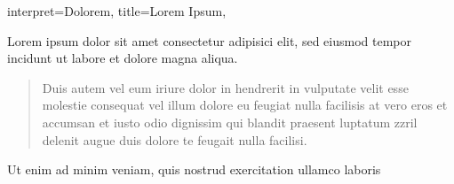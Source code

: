 \begin{song}{
interpret={Dolorem},
title={Lorem Ipsum},
}
\begin{chorus}
Lorem ipsum \leftrepeat\space\nolinebreak {}dolor sit amet \nolinebreak\rightrepeat\space \versebreak
{}consectetur adipisici elit, \versebreak
{}sed eiusmod tempor incidunt \versebreak
{}ut labore et dolore magna aliqua.
\end{chorus}

\begin{interlude}
\leftrepeat\space\nolinebreak {}  \normalbar\space {}  \leftrightrepeat\space {}  \normalbar\space {}  \nolinebreak\rightrepeat\space
\end{interlude}

\begin{verse}
  Duis autem vel eum iriure dolor in hendrerit in vulputate velit esse molestie \versebreak
{}consequat vel illum   dolore eu feugiat nulla facilisis at vero \versebreak
{}  eros et accumsan et iusto odio dignissim qui blandit praesent luptatum zzril \versebreak
\leftrepeat\space\nolinebreak {}delenit augue duis   dolore te feugait nulla facilisi.  \nolinebreak\rightrepeat
\end{verse}

\begin{bridge}
\leftrepeat\space\nolinebreak %
Ut enim ad minim veniam, quis nostrud exercitation ullamco laboris
\nolinebreak\rightrepeat
\end{bridge}


\end{song}
